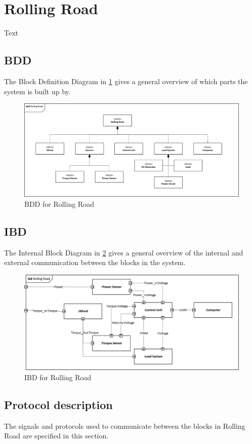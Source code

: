\section{Rolling Road}
Text

\subsection{BDD}
The Block Definition Diagram in \ref{fig:RR_BDD} gives a general overview of which parts the system is built up by.

\begin{figure}[H]
	\centering
	\includegraphics[width=0.9\linewidth]{Architecture/BDD_RollingRoad}
	\caption{BDD for Rolling Road}
	\label{fig:RR_BDD}
\end{figure}

\subsection{IBD}
The Internal Block Diagram in \ref{fig:RR_IBD} gives a general overview of the internal and external communication between the blocks in the system.

\begin{figure}[H]
	\centering
	\includegraphics[width=0.9\linewidth]{Architecture/IBD_RollingRoad}
	\caption{IBD for Rolling Road}
	\label{fig:RR_IBD}
\end{figure}

\subsection{Protocol description}
The signals and protocols used to communicate between the blocks in Rolling Road are specified in this section.

